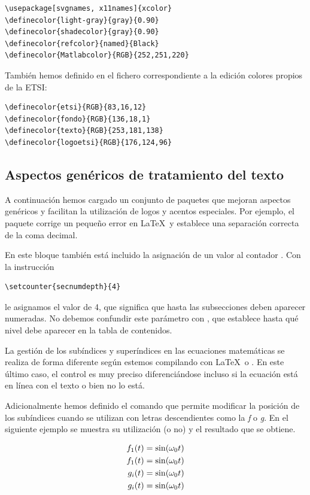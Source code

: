 \begin{lstlisting}[frame=none]
\usepackage[svgnames, x11names]{xcolor}
\definecolor{light-gray}{gray}{0.90}
\definecolor{shadecolor}{gray}{0.90}
\definecolor{refcolor}{named}{Black}
\definecolor{Matlabcolor}{RGB}{252,251,220}
\end{lstlisting}
%
También hemos definido en el fichero correspondiente a la edición colores propios de la ETSI:

\begin{lstlisting}[frame=none]
\definecolor{etsi}{RGB}{83,16,12}
\definecolor{fondo}{RGB}{136,18,1}
\definecolor{texto}{RGB}{253,181,138}
\definecolor{logoetsi}{RGB}{176,124,96}
\end{lstlisting}

\subsection{Aspectos genéricos de tratamiento del texto}
A continuación hemos cargado un conjunto de paquetes que mejoran aspectos genéricos y facilitan la utilización de logos y acentos especiales.  Por ejemplo, el paquete  corrige un pequeño error en \LaTeX\ y establece una separación correcta de la coma decimal.

En este bloque también está incluido la asignación de un valor al contador . Con la instrucción 

\begin{lstlisting}[frame=none]
\setcounter{secnumdepth}{4}
\end{lstlisting}
%
le asignamos el valor de 4, que significa que hasta las  subsecciones deben aparecer numeradas. No debemos confundir este parámetro con  , que establece hasta qué nivel debe aparecer en la tabla de contenidos. 

La gestión de los subíndices y superíndices en las ecuaciones matemáticas se realiza de forma diferente según estemos compilando con \LaTeX\ o \LuaLaTeX . En este último caso, el control es muy preciso diferenciándose incluso si la ecuación está en línea con el texto o bien no lo está.

Adicionalmente hemos definido el comando  que permite modificar la posición de los subíndices cuando se utilizan con letras descendientes como la \emph{f} o \emph{g}. En el siguiente ejemplo se muestra su utilización (o no) y el resultado que se obtiene.
\begin{LTXexample}[pos=r, hsep=15pt,width=0.45\textwidth]
\begin{align*}
f_{1}(t)&=\operatorname{sin}(\omega_{0}t)\\
f\sb{1}(t)&=\operatorname{sin}(\omega_{0}t)\\
g_{i}(t)&=\operatorname{sin}(\omega_{0}t)\\
g\sb{i}(t)&=\operatorname{sin}(\omega_{0}t)
\end{align*}
\end{LTXexample}

